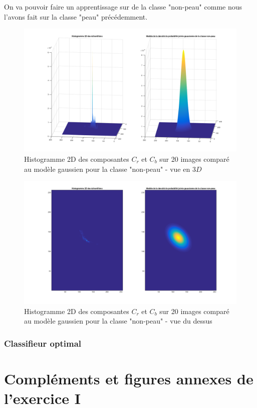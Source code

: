 \documentclass[11pt,a4paper]{article}
\begin{document}
On va pouvoir faire un apprentissage sur de la classe "non-peau" comme nous l'avons fait sur la classe "peau" précédemment.

\begin{figure}[H]
\center
\includegraphics[width=15cm]{exo2_hist2D_np.png}
\caption{Histogramme 2D des composantes $C_r$ et $C_b$ sur 20 images comparé au modèle gaussien pour la classe "non-peau" - vue en $3D$}
\end{figure} 

\begin{figure}[H]
\center
\includegraphics[width=12cm]{exo2_hist2D_vue_dessus_np.png}
\caption{Histogramme 2D des composantes $C_r$ et $C_b$ sur 20 images comparé au modèle gaussien pour la classe "non-peau" - vue du dessus}
\end{figure} 

\subsubsection{Classifieur optimal}

\newpage
\appendix
\section{Compléments et figures annexes de l'exercice I}
\end{document}
